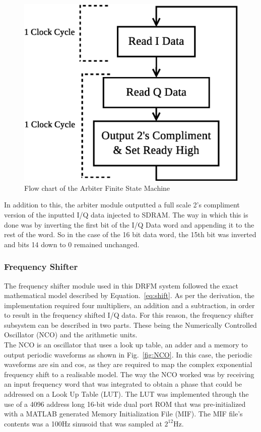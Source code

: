 		\begin{figure}[h!]
			\centering
			\includegraphics[width=0.52	\linewidth]{img/Arbiter_State_Machine}
			\caption{Flow chart of the Arbiter Finite State Machine }
			\label{fig:arbiterfsm}
		\end{figure}
	
		\noindent In addition to this, the arbiter module outputted a full scale 2's compliment version of the inputted I/Q data injected to SDRAM. The way in which this is done was by inverting the first bit of the I/Q Data word and appending it to the rest of the word. So in the case of the 16 bit data word, the 15th bit was inverted and bits 14 down to 0 remained unchanged. \\		  
		\subsubsection{Frequency Shifter}
		The frequency shifter module used in this DRFM system followed the exact mathematical model described by Equation.~\ref{eq:shift}. As per the derivation, the implementation required four multipliers, an addition and a subtraction, in order to result in the frequency shifted I/Q data. For this reason, the frequency shifter subsystem can be described in two parts. These being the Numerically Controlled Oscillator (NCO) and the arithmetic units. \\ \newline The NCO is an oscillator that uses a look up table, an adder and a memory to output periodic waveforms as shown in Fig.~\ref{fig:NCO}. In this case, the periodic waveforms are sin and cos, as they are required to map the complex exponential frequency shift to a realisable model. The way the NCO worked was by receiving an input frequency word that was integrated to obtain a phase that could be addressed on a Look Up Table (LUT). The LUT was implemented through the use of a 4096 address long 16-bit wide dual port ROM that was pre-initialized with a MATLAB generated Memory Initialization File (MIF). The MIF file's contents was a 100Hz sinusoid that was sampled at $2^{12}$Hz. 
			
